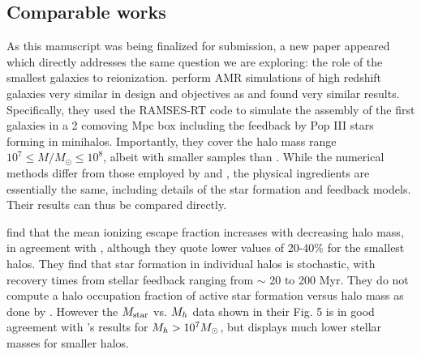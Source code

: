 \documentclass[iop,apj]{emulateapj}
\begin{document}
\subsection{Comparable works}
\label{subsec:works}
As this manuscript was being finalized for submission, a new paper appeared which directly addresses the same question we are exploring: the role of the smallest galaxies to reionization. 
\cite{Kimm17} perform AMR simulations of high redshift galaxies very similar in design and objectives as \cite{Wise14} and found very similar results. Specifically, they used the RAMSES-RT code \citep{Rosdahl15} to simulate the assembly of the first galaxies in a 2 comoving Mpc box including the feedback by Pop III stars forming in minihalos. Importantly, they cover the halo mass range $10^7 \leq M/M_{\odot} \leq 10^8$, albeit with smaller samples than \cite{Xu16}. While the numerical methods differ from those employed by \cite{Wise14} and \cite{Xu16}, the physical ingredients are essentially the same, including details of the star formation and feedback models. Their results can thus be compared directly. 

\cite{Kimm17} find that the mean ionizing escape fraction increases with decreasing halo mass, in agreement with \citep{Wise14,Xu16}, although they quote lower values of 20-40\% for the smallest halos. They find that star formation in individual halos is stochastic, with recovery times from stellar feedback ranging from $\sim$ 20 to 200 Myr. They do not compute a halo occupation fraction of active star formation versus halo mass as done by \cite{Xu16}. However the $M_{\rm star}$ vs. $M_h$ data shown in their Fig. 5 is in good agreement with \citet{Xu16}'s results for $\mh > 10^7\Ms$, but displays much lower stellar masses for smaller halos.
\end{document}
